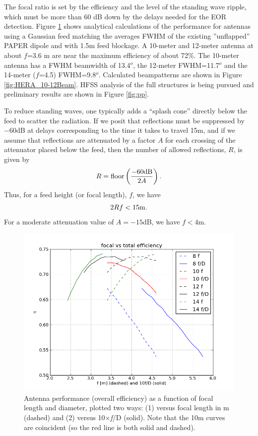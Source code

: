 \documentclass[11pt]{article}
\begin{document}
The focal ratio is set by the efficiency and the level of the standing wave ripple, which must be more than 60 dB down by the delays needed for the EOR detection.  Figure \ref{fig:heraDishfDplot} shows analytical calculations of the performance for antennas using a Gaussian feed matching the averages FWHM of the existing ''unflapped'' PAPER dipole and with 1.5m feed blockage.  A 10-meter and 12-meter antenna at about $f$=3.6 m are near the maximum efficiency of about 72\%.  The 10-meter antenna has a FWHM beamwidth of 13.4$^o$, the 12-meter FWHM=11.7$^o$ and the 14-meter ($f$=4.5) FWHM=9.8$^o$.  Calculated beampatterns are shown in Figure \ref{fig:HERA_10-12Beam}.  HFSS analysis of the full structures is being pursued and preliminary results are shown in Figure \ref{fig:pp}.

To reduce standing waves, one typically adds a ``splash cone'' directly below the feed to scatter the radiation.
If we posit that reflections must be suppressed by $-60$dB at delays corresponding to the time it takes
to travel 15m, and if we assume that reflections are attenuated by a factor $A$ for each crossing of the
attenuator placed below the feed, then the number of allowed reflections, $R$, is given by
\begin{equation}
R={\rm floor}\left(\frac{-60{\rm dB}}{2A}\right).
\end{equation}
Thus, for a feed height (or focal length), $f$, we have
\begin{equation}
2Rf<15{\rm m}.
\end{equation}
For a moderate attenuation value of $A=-15$dB, we have $f<4$m.

\begin{figure}[H]
\centering
\includegraphics[width=\textwidth]{plots/heraDishfDplot.png}
\caption{Antenna performance (overall efficiency) as a function of focal length and diameter, plotted two ways:  (1) versus focal length in m (dashed) and (2) versus 10$\times${\em f}/D (solid).  Note that the 10m curves are coincident (so the red line is both solid and dashed).}
\label{fig:heraDishfDplot}
\end{figure}
\end{document}
